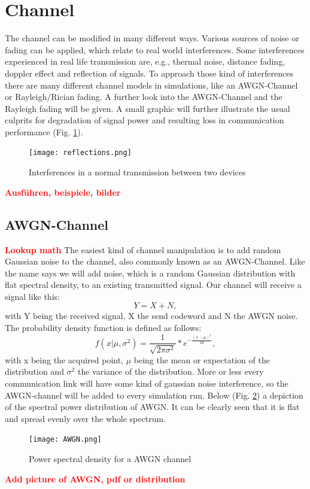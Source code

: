 \documentclass[12pt,oneside, reqno]{report}
\newcommand\boldred[1]{\textcolor{red}{\textbf{#1}}}
\begin{document}
\section{Channel}
\label{sec:channel}
The channel can be modified in many different ways. Various sources of noise or fading can be applied, which relate to real world interferences. Some interferences experienced in real life transmission are, e.g., thermal noise, distance fading, doppler effect and reflection of signals. To approach those kind of interferences there are many different channel models in simulations, like an \gls{AWGN}-Channel or Rayleigh/Rician fading. A further look into the \gls{AWGN}-Channel and the Rayleigh fading will be given. A small graphic will further illustrate the usual culprits for degradation of signal power and resulting loss in communication performance (Fig. \ref{fig:interferences}).
\newline
\begin{figure}[H]
	\centering
	\texttt{[image: reflections.png]}
	\caption{Interferences in a normal transmission between two devices}
	\label{fig:interferences}
\end{figure}
\boldred{Ausführen, beispiele, bilder}
\newpage
\subsection{AWGN-Channel}
\boldred{Lookup math}
\newline
The easiest kind of channel manipulation is to add random Gaussian noise to the channel, also commonly known as an \gls{AWGN}-Channel. Like the name says we will add noise, which is a random Gaussian distribution with flat spectral density, to an existing transmitted signal. Our channel will receive a signal like this:
\begin{equation}
\label{eq:1.1}
Y = X + N ,
\end{equation}
 with Y being the received signal, X the send codeword and N the AWGN noise.
\newline
The probability density function is defined as follows:
\begin{equation}
\label{eq:AWGNpdf}
f(x|\mu,\sigma^2) = \frac{1}{\sqrt{2\pi\sigma^2}}*e^{-\frac{(x-\mu)^2}{2\mu}},  
\end{equation}
with x being the acquired point, $\mu$ being the mean or expectation of the distribution and $\sigma^2$ the variance of the distribution. 
\newline
More or less every communication link will have some kind of gaussian noise interference, so the \gls{AWGN}-channel will be added to every simulation run.  Below (Fig. \ref{fig:AWGN}) a depiction of the spectral power distribution of \gls{AWGN}. It can be clearly seen that it is flat and spread evenly over the whole spectrum.
\begin{figure}[H]
	\centering
	\texttt{[image: AWGN.png]}
	\caption{Power spectral density for a AWGN channel}
	\label{fig:AWGN}
\end{figure}
\boldred{Add picture of AWGN, pdf or distribution}
\end{document}
